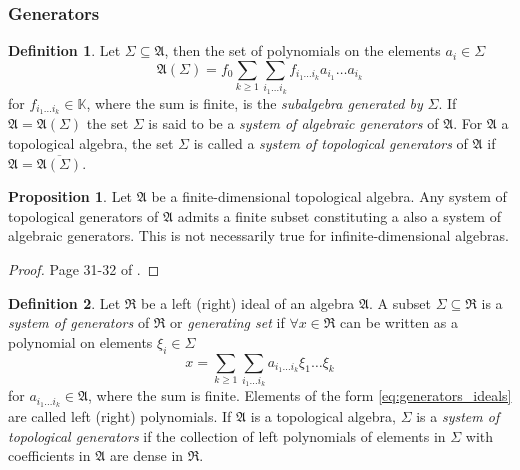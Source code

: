 \documentclass{article}
\theoremstyle{definition}
\newtheorem{definition}{Definition}
\newtheorem{proposition}{Proposition}
\begin{document}
\subsubsection{Generators}

\begin{definition}
    Let $\Sigma \subseteq \mathfrak{A}$, then the set of polynomials on the elements $a_i \in \Sigma$
    \begin{equation}
        \label{eq:generators_algebra}
        \mathfrak{A}(\Sigma) = f_0 \sum_{k \geq 1} \sum_{i_1 \dots i_k}
        f_{i_1\dots i_k} a_{i_1} \dots a_{i_k}
    \end{equation}
    for $f_{i_1 \dots i_k} \in \mathbb{K}$, where the sum is finite, is the \emph{subalgebra generated by} $\Sigma$. If $\mathfrak{A} = \mathfrak{A}(\Sigma)$ the set $\Sigma$ is said to be a \emph{system of algebraic generators} of $\mathfrak{A}$. For $\mathfrak{A}$ a topological algebra, the set $\Sigma$ is called a \emph{system of topological generators} of $\mathfrak{A}$ if $\mathfrak{A} = \overline{\mathfrak{A}(\Sigma)}$.
\end{definition}

\begin{proposition}
    Let $\mathfrak{A}$ be a finite-dimensional topological algebra. Any system of topological generators of $\mathfrak{A}$ admits a finite subset constituting a also a system of algebraic generators. This is not necessarily true for infinite-dimensional algebras.
\end{proposition}
\begin{proof}
    Page 31-32 of \cite{berezin_introduction_1987}.
\end{proof}

\begin{definition}
    Let $\mathfrak{R}$ be a left (right) ideal of an algebra $\mathfrak{A}$. A subset $\Sigma \subseteq \mathfrak{R}$ is a \emph{system of generators} of $\mathfrak{R}$ or \emph{generating set} if $\forall x \in \mathfrak{R}$ can be written as a polynomial on elements $\xi_i \in \Sigma$
    \begin{equation}
        \label{eq:generators_ideals}
        x = \sum_{k \geq 1} \sum_{i_1 \dots i_k} a_{i_1 \dots i_k} \xi_1 \dots \xi_k
    \end{equation}
    for $a_{i_1 \dots i_k} \in \mathfrak{A}$, where the sum is finite. Elements of the form \eqref{eq:generators_ideals} are called left (right) polynomials. If $\mathfrak{A}$ is a topological algebra, $\Sigma$ is a \emph{system of topological generators} if the collection of left polynomials of elements in $\Sigma$ with coefficients in $\mathfrak{A}$ are dense in $\mathfrak{R}$.
\end{definition}
\end{document}
